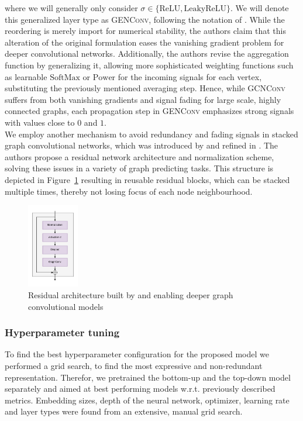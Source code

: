 \documentclass{bioinfo}
\begin{document}
where we will generally only consider $\sigma \in \{\mathrm{ReLU}, \mathrm{LeakyReLU}\}$. We will denote this generalized layer type as \textsc{GENConv}, following the notation of \citet{PytorchGeometric}.
While the reordering is merely import for numerical stability, the authors claim that this alteration of the original formulation eases the vanishing gradient problem for deeper convolutional networks. Additionally, the authors revise the aggregation function by generalizing it, allowing more sophisticated weighting functions such as learnable $\mathrm{SoftMax}$ or $\mathrm{Power}$ for the incoming signals for each vertex, substituting the previously mentioned averaging step. Hence, while \textsc{GCNConv} suffers from both vanishing gradients and signal fading for large scale, highly connected graphs, each propagation step in \textsc{GENConv} emphasizes strong signals with values close to $0$ and $1$. \\

We employ another mechanism to avoid redundancy and fading signals in stacked graph convolutional networks, which was introduced by \citet{DeepGCN2019} and refined in \citet{DeeperGCN2020}. The authors propose a residual network architecture and normalization scheme, solving these issues in a variety of graph predicting tasks. This structure is depicted in Figure~\ref{fig:ResGraphConvBlocks} resulting in reusable residual blocks, which can be stacked multiple times, thereby not losing focus of each node neighbourhood. \\

 \begin{figure}[!tpb]%
 	\centerline{\includegraphics[width=0.2\textwidth]{figures/ResGraphConvBlocks.png}}
 	\caption{Residual architecture built by \citet{DeepGCN2019} and \citet{DeeperGCN2020} enabling deeper graph convolutional models}
 	\label{fig:ResGraphConvBlocks}
 \end{figure}

\subsubsection{Hyperparameter tuning}
To find the best hyperparameter configuration for the proposed model we performed a grid search, to find the most expressive and non-redundant representation. Therefor, we pretrained the bottom-up and the top-down model separately and aimed at best performing models w.r.t. previously described metrics. Embedding sizes, depth of the neural network, optimizer, learning rate and layer types were found from an extensive, manual grid search. 
\end{document}
